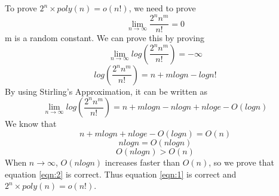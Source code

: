 \begin{solution}
    To prove $2^n \times poly(n)=o(n!)$, we need to prove
    \begin{equation}
        \label{eqn:1}
        \lim_{n \to \infty} \frac{2^nn^m}{n!} = 0
    \end{equation}
    m is a random constant. We can prove this by proving
    \begin{equation}
        \label{eqn:2}
        \lim_{n \to \infty} log(\frac{2^nn^m}{n!}) = -\infty
    \end{equation}
    $$log(\frac{2^nn^m}{n!}) = n + mlogn - logn!$$
    By using Stirling's Approximation, it can be written as
    $$\lim_{n \to \infty} log(\frac{2^nn^m}{n!}) = n + mlogn - nlogn + nloge - O(logn)$$
    We know that
    $$n + mlogn + nloge - O(logn) = O(n)$$
    $$nlogn = O(nlogn)$$
    $$O(nlogn) > O(n)$$
    When $n \to \infty$, $O(nlogn)$ increases faster than $O(n)$, 
    so we prove that equation \ref{eqn:2} is correct. Thus equation \ref{eqn:1} is correct and $2^n \times poly(n)=o(n!)$.

\end{solution}